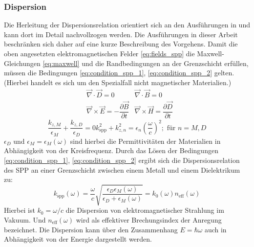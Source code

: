 \documentclass[titlepage]{article}
\begin{document}
	\subsubsection{Dispersion}
	Die Herleitung der Dispersionsrelation orientiert sich an den Ausführungen in \cite[pp.~261--ff]{Fox.2020} und kann dort im Detail nachvollzogen werden. Die Ausführungen in dieser Arbeit beschränken sich daher auf eine kurze Beschreibung des Vorgehens.
	Damit die oben angesetzten elektromagnetischen Felder \eqref{eq:fields_spp}  die Maxwell-Gleichungen \eqref{eq:maxwell} und die Randbedingungen an der Grenzschicht erfüllen, müssen die Bedingungen \eqref{eq:condition_spp_1},  \eqref{eq:condition_spp_2} gelten. (Hierbei handelt es sich um den Spezialfall nicht magnetischer Materialien.)
	\begin{align}
		\label{eq:maxwell}	
		&\vec{\nabla}\cdot\vec{D} = 0		&\vec{\nabla}\cdot\vec{B} = 0 \\
		&\vec{\nabla}\times\vec{E} = -\dfrac{\partial\vec{B}}{\partial t} 
		&\vec{\nabla}\times\vec{H} = 	\dfrac{\partial\vec{D}}{\partial t}\nonumber
	\end{align}
	\begin{subequations}
		\begin{equation}
			\label{eq:condition_spp_1}
			\dfrac{k_{z, M}}{\epsilon_M} + \dfrac{k_{z, D}}{\epsilon_D} = 0
		\end{equation}		
		\begin{equation}
			\label{eq:condition_spp_2}
			k_{\mathrm{spp}}^2 +k_{z, n}^2 = \epsilon_n\left(\dfrac{\omega}{c}\right)^2; \text{ für  } n=M,D
		\end{equation}
	\end{subequations}
	$\epsilon_D$ und $\epsilon_M = \epsilon_M(\omega) $ sind hierbei die Permittivitäten der Materialien in Abhängigkeit von der Kreisfrequenz.
	Durch das Lösen der Bedingungen \eqref{eq:condition_spp_1},  \eqref{eq:condition_spp_2} ergibt sich die Dispersionsrelation des SPP an einer Grenzschicht zwischen einem Metall und einem Dielektrikum zu: 
	\begin{equation}
		\label{eq:dispersion_spp}
		\boxed{
			k_{\mathrm{spp}}\left(\omega\right) = \dfrac{\omega}{c} \sqrt{\dfrac{\epsilon_D\epsilon_M(\omega)}{\epsilon_D + 	\epsilon_M(\omega)}}  = k_0(\omega) n_{\mathrm{eff}}(\omega)}
	\end{equation}
	Hierbei ist $k_0 = \omega / c$ die Dispersion von elektromagnetischer Strahlung im Vakuum. Und $n_{\mathrm{eff}}(\omega)$ wird als effektiver Brechungsindex der Anregung bezeichnet. Die Dispersion kann über den Zusammenhang $E = \hbar \omega$ auch in Abhängigkeit von der Energie dargestellt werden.
	
\end{document}
